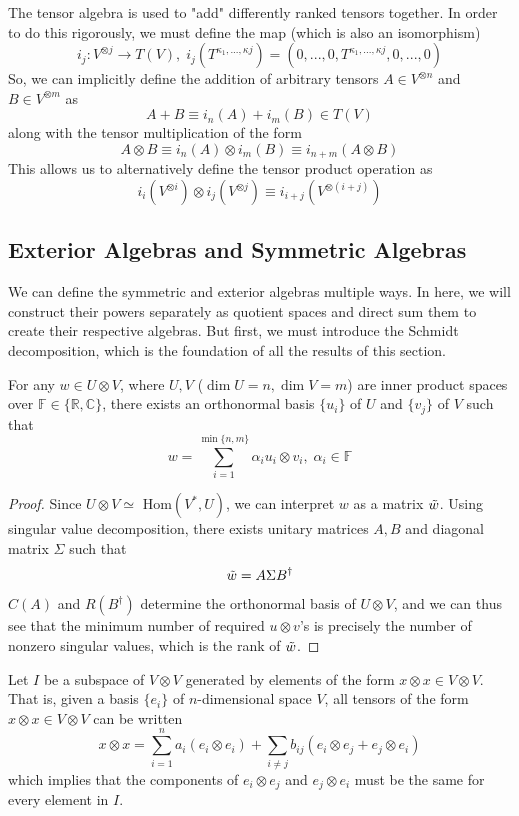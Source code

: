 \documentclass{article}
\begin{document}
    The tensor algebra is used to "add" differently ranked tensors together. In order to do this rigorously, we must define the map (which is also an isomorphism)
    \[i_j: V^{\otimes j} \longrightarrow T(V), \; i_j (T^{\kappa_1, ..., \kappa j}) = (0, ...,0, T^{\kappa_1, ..., \kappa j}, 0, ..., 0) \]
    So, we can implicitly define the addition of arbitrary tensors $A \in V^{\otimes n}$ and $B \in V^{\otimes m}$ as 
    \[ A + B \equiv i_n (A) + i_m (B) \in T(V)\]
    along with the tensor multiplication of the form
    \[ A \otimes B \equiv i_n(A) \otimes i_m(B) \equiv i_{n+m} (A \otimes B)\]
    This allows us to alternatively define the tensor product operation as
    \[i_i(V^{\otimes i}) \otimes i_j( V^{\otimes j}) \equiv i_{i+j} (V^{\otimes (i+j)})\]

  \subsection{Exterior Algebras and Symmetric Algebras}

    We can define the symmetric and exterior algebras multiple ways. In here, we will construct their powers separately as quotient spaces and direct sum them to create their respective algebras. But first, we must introduce the Schmidt decomposition, which is the foundation of all the results of this section. 

    \begin{theorem}
    For any $w \in U \otimes V$, where $U, V$ ($\dim{U} = n, \dim{V} = m$)  are inner product spaces over $\mathbb{F} \in \{ \mathbb{R}, \mathbb{C}\}$, there exists an orthonormal basis $\{u_i\}$ of $U$ and $\{v_j\}$ of $V$ such that 
    \[ w = \sum_{i=1}^{\min{\{n, m\}}} \alpha_i u_i \otimes v_i, \; \alpha_i \in \mathbb{F}\]
    \end{theorem}
    \begin{proof}
    Since $U \otimes V \simeq $ Hom$(V^*, U)$, we can interpret $w$ as a matrix $\Tilde{w}$. Using singular value decomposition, there exists unitary matrices $A, B$ and diagonal matrix $\Sigma$ such that
    \[\Tilde{w} = A \Sigma B^\dagger\]
    $C(A)$ and $R(B^\dagger)$ determine the orthonormal basis of $U \otimes V$, and we can thus see that the minimum number of required $u \otimes v$'s is precisely the number of nonzero singular values, which is the rank of $\Tilde{w}$. 

    \end{proof}

    \begin{definition}
    Let $I$ be a subspace of $V \otimes V$ generated by elements of the form $x \otimes x \in V \otimes V$. That is, given a basis $\{e_i\}$ of $n$-dimensional space $V$, all tensors of the form $x \otimes x \in V \otimes V$ can be written 
    \[x \otimes x = \sum_{i=1}^n a_i (e_i \otimes e_i) + \sum_{i \neq j} b_{i j} (e_i \otimes e_j + e_j \otimes e_i)\]
    which implies that the components of $e_i \otimes e_j$ and $e_j \otimes e_i$ must be the same for every element in $I$. 
    \end{definition}
\end{document}
